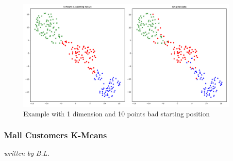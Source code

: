 \begin{figure}[H]
\caption{Example with 1 dimension and 10 points bad starting position}
\begin{center}
\includegraphics[width=1.0\textwidth]{images/kmeans_seeds_tsne.pdf}
\end{center}
\label{fig:kmeans_seeds_tsne}
\end{figure}


\subsubsection{Mall Customers K-Means}
\textit{written by B.L.}\\

